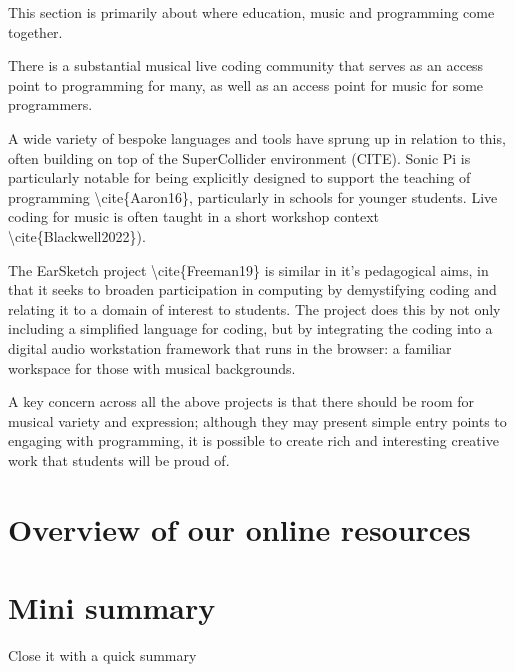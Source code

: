  This section is primarily about where education, music and programming come together.


 There is a substantial musical live coding community that serves as an access point to programming for many, as well as an access point for music for some programmers.

A wide variety of bespoke languages and tools have sprung up in relation to this, often building on top of the SuperCollider environment (CITE). Sonic Pi is particularly notable for being explicitly designed to support the teaching of programming \textbackslash{}cite\{Aaron16\}, particularly in schools for younger students. Live coding for music is often taught in a short workshop context \textbackslash{}cite\{Blackwell2022\}).

The EarSketch project \textbackslash{}cite\{Freeman19\} is similar in it’s pedagogical aims, in that it seeks to broaden participation in computing by demystifying coding and relating it to a domain of interest to students. The project does this by not only including a simplified language for coding, but by integrating the coding into a digital audio workstation framework that runs in the browser: a familiar workspace for those with musical backgrounds. 

A key concern across all the above projects is that there should be room for musical variety and expression; although they may present simple entry points to engaging with programming, it is possible to create rich and interesting creative work that students will be proud of.


 

\section{Overview of our online resources} \label{sec:resources}


\section{Mini summary}
Close it with a quick summary


